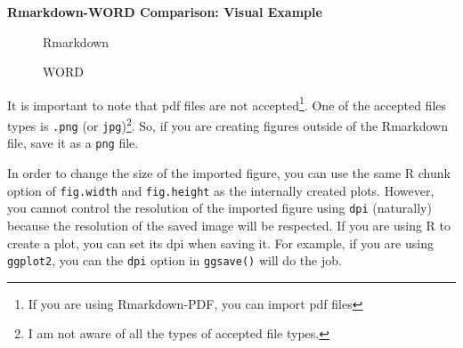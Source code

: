 \documentclass[
  letterpaper,
  DIV=11,
  numbers=noendperiod]{scrreprt}
\begin{document}
\begin{tcolorbox}[enhanced jigsaw, colframe=quarto-callout-note-color-frame, breakable, left=2mm, toprule=.15mm, colback=white, arc=.35mm, rightrule=.15mm, bottomrule=.15mm, opacityback=0, leftrule=.75mm]

\textbf{Rmarkdown-WORD Comparison: Visual Example}\vspace{2mm}

\begin{figure}[H]

\begin{minipage}[t]{\linewidth}

{\centering 


\caption{Rmarkdown}

}

\end{minipage}%
\newline
\begin{minipage}[t]{\linewidth}

{\centering 


\caption{WORD}

}

\end{minipage}%

\end{figure}

\end{tcolorbox}

It is important to note that pdf files are not accepted\footnote{If you
  are using Rmarkdown-PDF, you can import pdf files}. One of the
accepted files types is \texttt{.png} (or \texttt{jpg})\footnote{I am
  not aware of all the types of accepted file types.}. So, if you are
creating figures outside of the Rmarkdown file, save it as a
\texttt{png} file.

In order to change the size of the imported figure, you can use the same
R chunk option of \texttt{fig.width} and \texttt{fig.height} as the
internally created plots. However, you cannot control the resolution of
the imported figure using \texttt{dpi} (naturally) because the
resolution of the saved image will be respected. If you are using R to
create a plot, you can set its dpi when saving it. For example, if you
are using \texttt{ggplot2}, you can the \texttt{dpi} option in
\texttt{ggsave()} will do the job.
\end{document}
